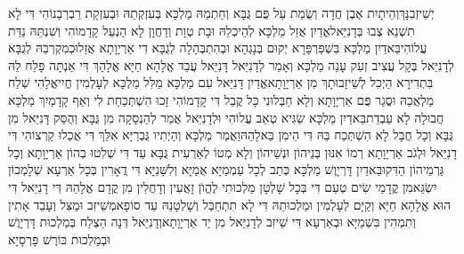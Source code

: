 \documentclass[../main/main.tex]{subfiles}
\begin{document}
\begin{multicols*}{\ncols}
יְשֵׁיזְבִנָּךְ\PreVerseSpace{}וְהֵיתָיִת אֶבֶן חֲדָה וְשֻׂמַת עַל פֻּם גֻּבָּא וְחַתְמַהּ מַלְכָּא בְּעִזְקְתֵהּ וּבְעִזְקָת רַבְרְבָנוֹהִי דִּי לָא תִשְׁנֵא צְבוּ בְּדָנִיֵּאל\PreVerseSpace{}אֱדַיִן אֲזַל מַלְכָּא לְהֵיכְלֵהּ וּבָת טְוָת וְדַחֲוָן לָא הַנְעֵל קָדָמוֹהִי וְשִׁנְתֵּהּ נַדַּת עֲלוֹהִי\PreVerseSpace{}בֵּאדַיִן מַלְכָּא בִּשְׁפַּרְפָּרָא יְקוּם בְּנָגְהָא וּבְהִתְבְּהָלָה לְגֻבָּא דִי אַרְיָוָתָא אֲזַל\PreVerseSpace{}וּכְמִקְרְבֵהּ לְגֻבָּא לְדָנִיֵּאל בְּקָל עֲצִיב זְעִק עָנֵה מַלְכָּא וְאָמַר לְדָנִיֵּאל דָּנִיֵּאל עֲבֵד אֱלָהָא חַיָּא אֱלָהָךְ דִּי אַנְתָּה פָּלַח לֵהּ בִּתְדִירָא הַיְכִל לְשֵׁיזָבוּתָךְ מִן אַרְיָוָתָא\PreVerseSpace{}אֱדַיִן דָּנִיֵּאל עִם מַלְכָּא מַלִּל מַלְכָּא לְעָלְמִין חֱיִי\PreVerseSpace{}אֱלָהִי שְׁלַח מַלְאֲכֵהּ וּסֲגַר פֻּם אַרְיָוָתָא וְלָא חַבְּלוּנִי כָּל קֳבֵל דִּי קָדָמוֹהִי זָכוּ הִשְׁתְּכַחַת לִי וְאַף קָדָמַיִךְ מַלְכָּא חֲבוּלָה לָא עַבְדֵת\PreVerseSpace{}בֵּאדַיִן מַלְכָּא שַׂגִּיא טְאֵב עֲלוֹהִי וּלְדָנִיֵּאל אֲמַר לְהַנְסָקָה מִן גֻּבָּא וְהֻסַּק דָּנִיֵּאל מִן גֻּבָּא וְכָל חֲבָל לָא הִשְׁתְּכַח בֵּהּ דִּי הֵימִן בֵּאלָהֵהּ\PreVerseSpace{}וַאֲמַר מַלְכָּא וְהַיְתִיו גֻּבְרַיָּא אִלֵּךְ דִּי אֲכַלוּ קַרְצוֹהִי דִּי דָנִיֵּאל וּלְגֹב אַרְיָוָתָא רְמוֹ אִנּוּן בְּנֵיהוֹן וּנְשֵׁיהוֹן וְלָא מְטוֹ לְאַרְעִית גֻּבָּא עַד דִּי שְׁלִטוּ בְהוֹן אַרְיָוָתָא וְכָל גַּרְמֵיהוֹן הַדִּקוּ\PreVerseSpace{}בֵּאדַיִן דָּרְיָוֶשׁ מַלְכָּא כְּתַב לְכָל עַמְמַיָּא אֻמַיָּא וְלִשָּׁנַיָּא דִּי דֲאָרִין בְּכָל אַרְעָא שְׁלָמְכוֹן יִשְׂגֵּא\PreVerseSpace{}מִן קֳדָמַי שִׂים טְעֵם דִּי בְּכָל שָׁלְטָן מַלְכוּתִי לֶהֱוֺן זָאֲעִין וְדָחֲלִין מִן קֳדָם אֱלָהֵהּ דִּי דָנִיֵּאל דִּי הוּא אֱלָהָא חַיָּא וְקַיָּם לְעָלְמִין וּמַלְכוּתֵהּ דִּי לָא תִתְחַבַּל וְשָׁלְטָנֵהּ עַד סוֹפָא\PreVerseSpace{}מְשֵׁיזִב וּמַצִּל וְעָבֵד אָתִין וְתִמְהִין בִּשְׁמַיָּא וּבְאַרְעָא דִּי שֵׁיזִב לְדָנִיֵּאל מִן יַד אַרְיָוָתָא\PreVerseSpace{}וְדָנִיֵּאל דְּנָה הַצְלַח בְּמַלְכוּת דָּרְיָוֶשׁ וּבְמַלְכוּת כּוֹרֶשׁ פָּרְסָיָא\OpenSection{}\par

\end{multicols*}
\end{document}
